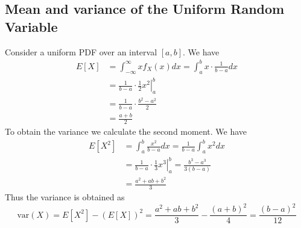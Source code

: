 \documentclass{report}
\begin{document}
\subsection{Mean and variance of the Uniform Random Variable}
Consider a uniform PDF over an interval $[a,b]$. We have
\begin{align*}
E[X]&=\int^\infty_{-\infty}xf_X(x)dx=\int^b_ax\cdot\frac{1}{b-a}dx\\
&=\left.\frac{1}{b-a}\cdot\frac{1}{2}x^2\right|^b_a\\
&=\frac{1}{b-a}\cdot\frac{b^2-a^2}{2}\\
&=\frac{a+b}{2}
\end{align*}
To obtain the variance we calculate the second moment. We have
\begin{align*}
E[X^2]&=\int^b_a\frac{x^2}{b-a}dx=\frac{1}{b-a}\int^b_ax^2dx\\
&=\left.\frac{1}{b-a}\cdot\frac{1}{3}x^3\right|^b_a=\frac{b^3-a^3}{3(b-a)}\\
&=\frac{a^2+ab+b^2}{3}
\end{align*}
Thus the variance is obtained as
\begin{equation*}
\text{var}(X)=E[X^2]-(E[X])^2=\frac{a^2+ab+b^2}{3}-\frac{(a+b)^2}{4}=\frac{(b-a)^2}{12}
\end{equation*}
\newpage
\end{document}
